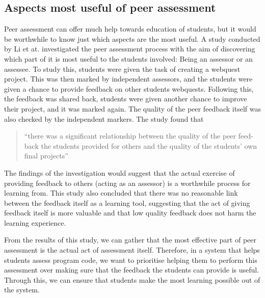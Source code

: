 \documentclass[a4paper,11pt]{report}
\begin{document}
\subsection{Aspects most useful of peer assessment}
Peer assessment can offer much help towards education of students, but it would be worthwhile to know just which aspects are the most useful. A study conducted by Li et at. \cite{li_assessor_2010} investigated the peer assessment process with the aim of discovering which part of it is most useful to the students involved: Being an assessor or an assessee. To study this, students were given the task of creating a webquest project. This was then marked by independent assessors, and the students were given a chance to provide feedback on other students webquests. Following this, the feedback was shared back, students were given another chance to improve their project, and it was marked again. The quality of the peer feedback itself was also checked by the independent markers. The study found that 
\begin{quote}
``there was a significant relationship between the quality of the peer feed-back the students provided for others and the quality of the students' own final projects''
\end{quote}
The findings of the investigation would suggest that the actual exercise of providing feedback to others (acting as an assessor) is a worthwhile process for learning from. This study also concluded that there was no reasonable link between the feedback itself as a learning tool, suggesting that the act of giving feedback itself is more valuable and that low quality feedback does not harm the learning experience.\par
From the results of this study, we can gather that the most effective part of peer assessment is the actual act of assessment itself. Therefore, in a system that helps students assess program code, we want to prioritise helping them to perform this assessment over making sure that the feedback the students can provide is useful. Through this, we can ensure that students make the most learning possible out of the system.
\end{document}
